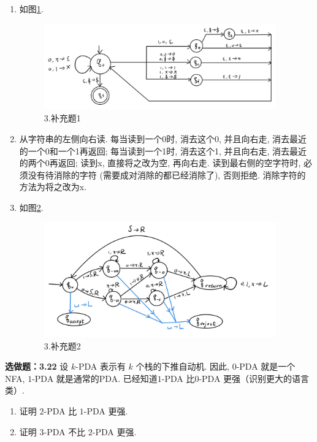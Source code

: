 \documentclass[UTF8]{report}
\newcommand{\problem}[1]{{\setlength{\parskip}{10pt}\noindent \bf{#1}}}
\newenvironment{solution}{{\noindent\hskip 2em \bf 解 \quad}}{}
\begin{document}
\begin{solution}
    \begin{enumerate}
        \item 如图\ref{fig:3_补充题1}.

        \begin{figure}[!htbp]
            \centering
            \includegraphics[width=10cm]{image/3.补充题1.png}
            \caption{3.补充题1}
            \label{fig:3_补充题1}
        \end{figure}

        \item 从字符串的左侧向右读. 每当读到一个0时, 消去这个0, 并且向右走, 消去最近的一个0和一个1再返回; 每当读到一个1时, 消去这个1, 并且向右走, 消去最近的两个0再返回; 读到x, 直接将之改为空, 再向右走. 读到最右侧的空字符时, 必须没有待消除的字符 (需要成对消除的都已经消除了), 否则拒绝. 消除字符的方法为将之改为x.
        \item 如图\ref{fig:3_补充题2}.

        \begin{figure}[!htbp]
            \centering
            \includegraphics[width=10cm]{image/3.补充题2.png}
            \caption{3.补充题2}
            \label{fig:3_补充题2}
        \end{figure}

    \end{enumerate}
\end{solution}


\newpage


\problem{选做题：3.22} 设 $k$-PDA 表示有 $k$ 个栈的下推自动机. 因此,  $0$-PDA 就是一个NFA, $1$-PDA 就是通常的PDA. 已经知道$1$-PDA 比$0$-PDA 更强（识别更大的语言类）. 
\begin{enumerate}
    \item 证明 $2$-PDA 比 $1$-PDA 更强. 
    \item 证明 $3$-PDA 不比 $2$-PDA 更强. 
\end{enumerate}
\end{document}
